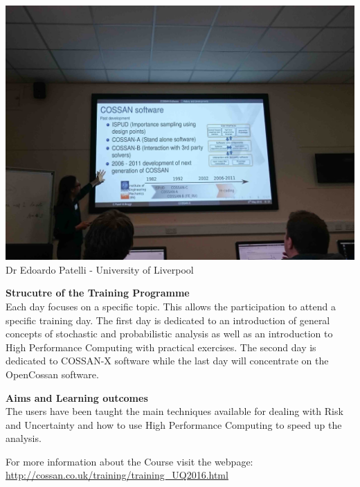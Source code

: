 \documentclass[11pt]{article}%
\begin{document}
\begin{minipage}{0.39\linewidth}
\begin{center}
\includegraphics[width=0.95\linewidth]{training/edo1_lr.jpg}\\
{\small Dr Edoardo Patelli - University of Liverpool}
\end{center}
\end{minipage}
\begin{minipage}{0.6\textwidth}
{\bf Strucutre of the Training Programme}\\
Each day focuses on a specific topic. This allows the participation to attend a specific training day. The first day is dedicated to an introduction of general concepts of stochastic and probabilistic analysis as well as an introduction to High Performance Computing with practical exercises. The second day is dedicated to COSSAN-X software while the last day will concentrate on the OpenCossan software.

{\bf Aims and Learning outcomes}\\
The users have been taught the main techniques available for dealing with Risk and Uncertainty and how to use High Performance Computing to speed up the analysis.
\end{minipage}

For more information about the Course visit the webpage: \href{http://cossan.co.uk/training/training\_UQ2016.html#}{http://cossan.co.uk/training/training\_UQ2016.html}
\end{document}
